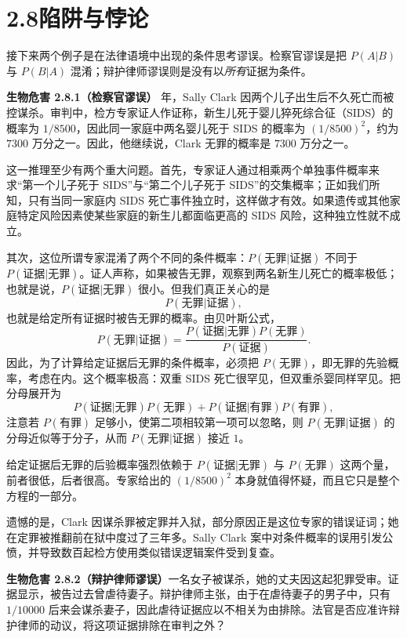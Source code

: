 \documentclass[UTF8, 12pt, fontset=fandol, oneside]{ctexart}
\begin{document}
\section*{2.8\quad 陷阱与悖论}

接下来两个例子是在法律语境中出现的条件思考谬误。检察官谬误是把 $P(A|B)$ 与 $P(B|A)$ 混淆；辩护律师谬误则是没有以\textit{所有}证据为条件。

\noindent\textbf{生物危害 2.8.1（检察官谬误）} 年，Sally Clark 因两个儿子出生后不久死亡而被控谋杀。审判中，检方专家证人作证称，新生儿死于婴儿猝死综合征（SIDS）的概率为 $1/8500$，因此同一家庭中两名婴儿死于 SIDS 的概率为 $(1/8500)^2$，约为 $7300$ 万分之一。因此，他继续说，Clark 无罪的概率是 $7300$ 万分之一。

这一推理至少有两个重大问题。首先，专家证人通过相乘两个单独事件概率来求“第一个儿子死于 SIDS”与“第二个儿子死于 SIDS”的交集概率；正如我们所知，只有当同一家庭内 SIDS 死亡事件独立时，这样做才有效。如果遗传或其他家庭特定风险因素使某些家庭的新生儿都面临更高的 SIDS 风险，这种独立性就不成立。

其次，这位所谓专家混淆了两个不同的条件概率：$P(\text{无罪}|\text{证据})$ 不同于 $P(\text{证据}|\text{无罪})$。证人声称，如果被告无罪，观察到两名新生儿死亡的概率极低；也就是说，$P(\text{证据}|\text{无罪})$ 很小。但我们真正关心的是
\[
  P(\text{无罪}|\text{证据}),
\]
也就是给定所有证据时被告无罪的概率。由贝叶斯公式，
\[
  P(\text{无罪}|\text{证据})
  =
  \frac{
    P(\text{证据}|\text{无罪})P(\text{无罪})
  }{
    P(\text{证据})
  }.
\]
因此，为了计算给定证据后无罪的条件概率，必须把 $P(\text{无罪})$，即无罪的先验概率，考虑在内。这个概率极高：双重 SIDS 死亡很罕见，但双重杀婴同样罕见。把分母展开为
\[
  P(\text{证据}|\text{无罪})P(\text{无罪})
  +
  P(\text{证据}|\text{有罪})P(\text{有罪}),
\]
注意若 $P(\text{有罪})$ 足够小，使第二项相较第一项可以忽略，则 $P(\text{无罪}|\text{证据})$ 的分母近似等于分子，从而 $P(\text{无罪}|\text{证据})$ 接近 $1$。

给定证据后无罪的后验概率强烈依赖于 $P(\text{证据}|\text{无罪})$ 与 $P(\text{无罪})$ 这两个量，前者很低，后者很高。专家给出的 $(1/8500)^2$ 本身就值得怀疑，而且它只是整个方程的一部分。

遗憾的是，Clark 因谋杀罪被定罪并入狱，部分原因正是这位专家的错误证词；她在定罪被推翻前在狱中度过了三年多。Sally Clark 案中对条件概率的误用引发公愤，并导致数百起检方使用类似错误逻辑案件受到复查。

\noindent\textbf{生物危害 2.8.2（辩护律师谬误）}\quad 一名女子被谋杀，她的丈夫因这起犯罪受审。证据显示，被告过去曾虐待妻子。辩护律师主张，由于在虐待妻子的男子中，只有 $1/10000$ 后来会谋杀妻子，因此虐待证据应以不相关为由排除。法官是否应准许辩护律师的动议，将这项证据排除在审判之外？
\end{document}
